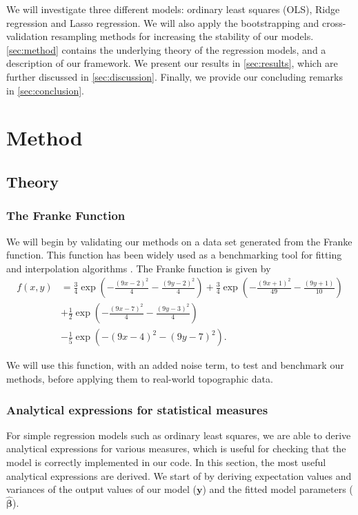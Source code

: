 \documentclass[12pt]{article}
\begin{document}
We will investigate three different models: ordinary least squares (OLS), Ridge regression and Lasso regression. We will also apply the bootstrapping and cross-validation resampling methods for increasing the stability of our models. \autoref{sec:method} contains the underlying theory of the regression models, and a description of our framework. We present our results in \autoref{sec:results}, which are further discussed in \autoref{sec:discussion}. Finally, we provide our concluding remarks in \autoref{sec:conclusion}.

\section{Method} \label{sec:method}
\subsection{Theory}

\subsubsection{The Franke Function}
We will begin by validating our methods on a data set generated from the Franke function. This function has been widely used as a benchmarking tool for fitting and interpolation algorithms \cite{project1}. The Franke function is given by 
\begin{align}\label{eq:Franke}
    f(x,y) &= \frac{3}{4}\exp{\left(-\frac{(9x-2)^2}{4} - \frac{(9y-2)^2}{4}\right)}+\frac{3}{4}\exp{\left(-\frac{(9x+1)^2}{49}- \frac{(9y+1)}{10}\right)} \nonumber\nonumber \\
    &+\frac{1}{2}\exp{\left(-\frac{(9x-7)^2}{4} - \frac{(9y-3)^2}{4}\right)} \nonumber \\
    &-\frac{1}{5}\exp{\left(-(9x-4)^2 - (9y-7)^2\right) }.
\end{align}

We will use this function, with an added noise term, to test and benchmark our methods, before applying them to real-world topographic data. 

\subsubsection{Analytical expressions for statistical measures}

For simple regression models such as ordinary least squares, we are able to derive analytical expressions for various measures, which is useful for checking that the model is correctly implemented in our code. In this section, the most useful analytical expressions are derived. We start of by deriving expectation values and variances of the output values of our model ($\mathbf{y}$) and the fitted model parameters ($\hat{\boldsymbol{\beta}}$).
\end{document}
